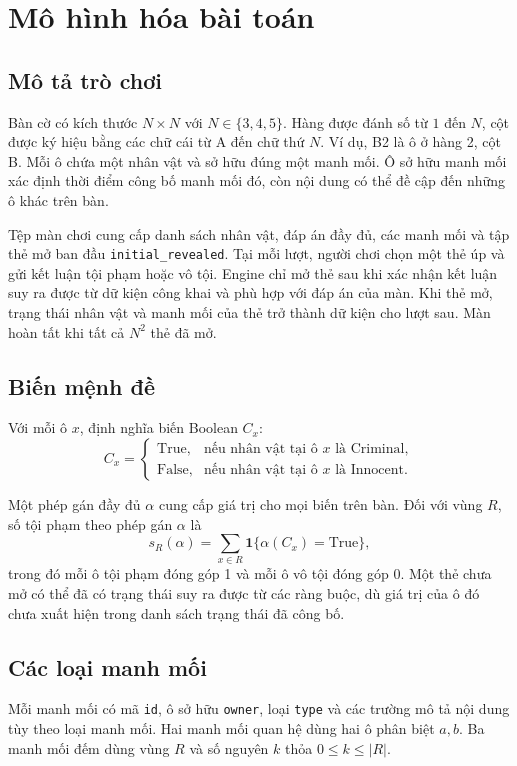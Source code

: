 \section{Mô hình hóa bài toán}
\label{sec:mohinh}

\subsection{Mô tả trò chơi}

Bàn cờ có kích thước $N\times N$ với $N\in\{3,4,5\}$. Hàng được đánh số từ
$1$ đến $N$, cột được ký hiệu bằng các chữ cái từ A đến chữ thứ $N$. Ví dụ,
B2 là ô ở hàng 2, cột B. Mỗi ô chứa một nhân vật và sở hữu đúng một manh
mối. Ô sở hữu manh mối xác định thời điểm công bố manh mối đó, còn nội
dung có thể đề cập đến những ô khác trên bàn.

Tệp màn chơi cung cấp danh sách nhân vật, đáp án đầy đủ, các manh mối và
tập thẻ mở ban đầu \texttt{initial\_revealed}. Tại mỗi lượt, người chơi
chọn một thẻ úp và gửi kết luận tội phạm hoặc vô tội. Engine chỉ mở thẻ
sau khi xác nhận kết luận suy ra được từ dữ kiện công khai và phù hợp
với đáp án của màn. Khi thẻ mở, trạng thái nhân vật và manh mối của thẻ
trở thành dữ kiện cho lượt sau. Màn hoàn tất khi tất cả $N^2$ thẻ đã mở.

\subsection{Biến mệnh đề}
Với mỗi ô $x$, định nghĩa biến Boolean $C_x$:
\[
C_x =
\begin{cases}
\text{True}, & \text{nếu nhân vật tại ô }x\text{ là Criminal},\\
\text{False}, & \text{nếu nhân vật tại ô }x\text{ là Innocent}.
\end{cases}
\]

Một phép gán đầy đủ $\alpha$ cung cấp giá trị cho mọi biến trên bàn.
Đối với vùng $R$, số tội phạm theo phép gán $\alpha$ là
\[
s_R(\alpha)=\sum_{x\in R}\mathbf{1}\{\alpha(C_x)=\text{True}\},
\]
trong đó mỗi ô tội phạm đóng góp 1 và mỗi ô vô tội đóng góp 0. Một thẻ
chưa mở có thể đã có trạng thái suy ra được từ các ràng buộc, dù giá trị
của ô đó chưa xuất hiện trong danh sách trạng thái đã công bố.

\subsection{Các loại manh mối}

Mỗi manh mối có mã \texttt{id}, ô sở hữu \texttt{owner}, loại
\texttt{type} và các trường mô tả nội dung tùy theo loại manh mối.
Hai manh mối quan hệ dùng hai ô phân biệt $a,b$. Ba manh mối đếm dùng
vùng $R$ và số nguyên $k$ thỏa $0\le k\le |R|$.

